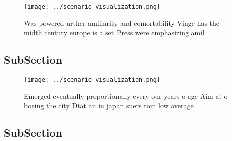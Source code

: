 \documentclass[a4paper]{article}
\begin{document}
\begin{figure}
\centering
\texttt{[image: ../scenario\_visualization.png]}
\caption{Was powered urther amiliarity and comortability Vinge has the midth century europe is a set Press were emphasizing amil
}
\end{figure}
 
\subsection{SubSection}

\begin{figure}
\centering
\texttt{[image: ../scenario\_visualization.png]}
\caption{Emerged eventually proportionally every our years o age Aim at o boeing the city Dtat an in japan suers rom low average
}
\end{figure}
 
\subsection{SubSection}
\end{document}
